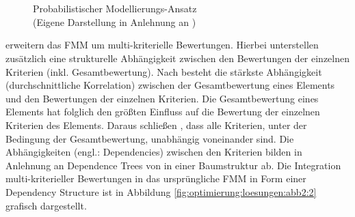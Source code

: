 \begin{figure}
    \centering
    \\
    \\
  \caption[Probabilistischer Modellierungs-Ansatz]{Probabilistischer Modellierungs-Ansatz\\
	(Eigene Darstellung in Anlehnung an \cite[S. 836]{adomavicius:4:inbook})}\label{fig:optimierung:loesungen:abb2}
\end{figure}

\textcite[S. 235]{sahoo:article} erweitern das \ac{FMM} um multi-kriterielle Bewertungen.
Hierbei unterstellen \textcite[S. 236f.]{sahoo:article} zusätzlich eine strukturelle Abhängigkeit zwischen den Bewertungen der einzelnen Kriterien (inkl. Gesamtbewertung).
Nach \textcite[S. 236f.]{sahoo:article} besteht die stärkste Abhängigkeit (durchschnittliche Korrelation) zwischen der Gesamtbewertung eines Elements und den Bewertungen der einzelnen Kriterien.
Die Gesamtbewertung eines Elements hat folglich den größten Einfluss auf die Bewertung der einzelnen Kriterien des Elements.
Daraus schließen \textcite[S. 236f.]{sahoo:article}, dass alle Kriterien, unter der Bedingung der Gesamtbewertung, unabhängig voneinander sind.
Die Abhängigkeiten (engl.: Dependencies) zwischen den Kriterien bilden \textcite[S. 235]{sahoo:article} in Anlehnung an Dependence Trees von \textcite[S. 463]{chow:article} in einer Baumstruktur ab.
Die Integration multi-kriterieller Bewertungen in das ursprüngliche \ac{FMM} in Form einer Dependency Structure ist in Abbildung \ref{fig:optimierung:loesungen:abb2:2} grafisch dargestellt.

